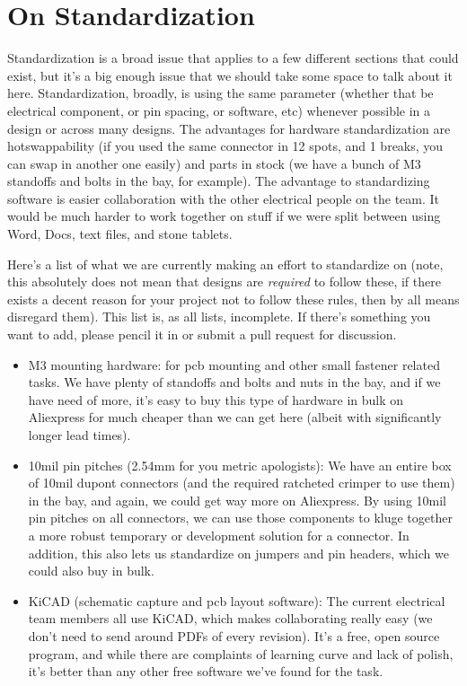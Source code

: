 \documentclass{article}
\begin{document}
\section{On Standardization}
Standardization is a broad issue that applies to a few different sections that 
could exist, but it's a big enough issue that we should take some space to talk 
about it here. Standardization, broadly, is using the same parameter (whether 
that be electrical component, or pin spacing, or software, etc) whenever 
possible in a design or across many designs. The advantages for hardware 
standardization are hotswappability (if you used the same connector in 12 spots,
and 1 breaks, you can swap in another one easily) and parts in stock (we have a
bunch of M3 standoffs and bolts in the bay, for example). The advantage to
standardizing software is easier collaboration with the other electrical people
on the team. It would be much harder to work together on stuff if we were split
between using Word, Docs, text files, and stone tablets.
\par
Here's a list of what we are currently making an effort to standardize on (note,
this absolutely does not mean that designs are \textit{required} to follow
these, if there exists a decent reason for your project not to follow these
rules, then by all means disregard them). This list is, as all lists,
incomplete. If there's something you want to add, please pencil it in or submit
a pull request for discussion.
\begin{itemize}
\item M3 mounting hardware: for pcb mounting and other small fastener related
tasks. We have plenty of standoffs and bolts and nuts in the bay, and if we have
need of more, it's easy to buy this type of hardware in bulk on Aliexpress for
much cheaper than we can get here (albeit with significantly longer lead times).
\item 10mil pin pitches (2.54mm for you metric apologists): We have an entire
box of 10mil dupont connectors (and the required ratcheted crimper to use them)
in the bay, and again, we could get way more on Aliexpress. By using 10mil pin
pitches on all connectors, we can use those components to kluge together a more
robust temporary or development solution for a connector. In addition, this also
lets us standardize on jumpers and pin headers, which we could also buy in bulk.
\item KiCAD (schematic capture and pcb layout software): The current electrical
team members all use KiCAD, which makes collaborating really easy (we don't need
to send around PDFs of every revision). It's a free, open source program, and
while there are complaints of learning curve and lack of polish, it's better
than any other free software we've found for the task.
\end{itemize}
\end{document}
